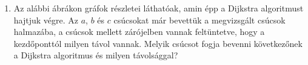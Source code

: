 \documentclass[a4paper,12pt]{article}
\begin{document}
\begin{enumerate}
        
        \item Az alábbi ábrákon gráfok részletei láthatóak, amin épp a Dijkstra algoritmust hajtjuk végre. Az $a$, $b$ és $c$ csúcsokat már bevettük a megvizsgált csúcsok halmazába, a csúcsok mellett zárójelben vannak feltüntetve, hogy a kezdőponttól milyen távol vannak. Melyik csúcsot fogja bevenni következőnek a Dijkstra algoritmus és milyen távolsággal?
        \begin{figure}[!h]
            \centering
            \begin{subfigure}{0.24\textwidth}
                \centering
                
            \end{subfigure}
            \begin{subfigure}{0.24\textwidth}
                \centering
                
            \end{subfigure}
            \begin{subfigure}{0.24\textwidth}
                \centering
                
            \end{subfigure}
            \begin{subfigure}{0.24\textwidth}
                \centering
                
            \end{subfigure}
        \end{figure}


\end{enumerate}
\end{document}

